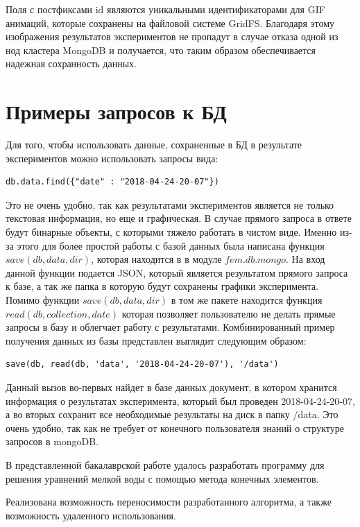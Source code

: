 \documentclass[14pt]{extreport}
\begin{document}
Поля с постфиксами id являются уникальными идентификаторами для GIF анимаций, которые сохранены на файловой системе GridFS. Благодаря этому изображения  результатов экспериментов не пропадут в случае отказа одной из нод кластера MongoDB и получается, что таким образом обеспечивается надежная сохранность данных.

\section{Примеры запросов к БД}
Для того, чтобы использовать данные, сохраненные в БД в результате экспериментов можно использовать запросы вида:

\begin{lstlisting}
db.data.find({"date" : "2018-04-24-20-07"})
\end{lstlisting}

Это не очень удобно, так как результатами экспериментов является не только текстовая информация, но еще и графическая. В случае прямого запроса в ответе будут бинарные объекты, с которыми тяжело работать в чистом виде. Именно из-за этого для более простой работы с базой данных была написана функция $save(db, data, dir)$, которая находится в в модуле $fem.db.mongo$. На вход данной функции подается JSON, который является результатом прямого запроса к базе, а так же папка в которую будут сохранены графики эксперимента. Помимо функции $save(db, data, dir)$ в том же пакете находится функция $read(db, collection, date)$ которая позволяет пользователю не делать прямые запросы в базу и облегчает работу с результатами. Комбинированный пример получения данных из базы представлен выглядит следующим образом:

\begin{lstlisting}
save(db, read(db, 'data', '2018-04-24-20-07'), '/data')
\end{lstlisting}

Данный вызов во-первых найдет в базе данных документ, в котором хранится информация о результатах эксперимента, который был проведен 2018-04-24-20-07, а во вторых сохранит все необходимые результаты на диск в папку /data. Это очень удобно, так как не требует от конечного пользователя знаний о структуре запросов в mongoDB. 


\conclusions

В представленной бакалаврской работе удалось разработать программу для решения уравнений мелкой воды с помощью метода конечных элементов.

Реализована возможность переносимости разработанного алгоритма, а также возможность удаленного использования.
\end{document}

